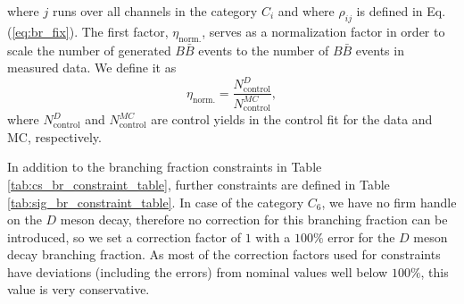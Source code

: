 where $j$ runs over all channels in the category $C_i$ and where $\rho_{ij}$ is defined in Eq. (\ref{eq:br_fix}). The first factor, $\eta_{\mathrm{norm.}}$, serves as a normalization factor in order to scale the number of generated $B \bar B$ events to the number of $B \bar B$ events in measured data. We define it as
\begin{equation}
\eta_{\mathrm{norm.}} = \frac{N_{\mathrm{control}}^D}{N_{\mathrm{control}}^{MC}},
\end{equation}
where $N_{\mathrm{control}}^D$ and $N_{\mathrm{control}}^{MC}$ are control yields in the control fit for the data and MC, respectively.

In addition to the branching fraction constraints in Table \ref{tab:cs_br_constraint_table}, further constraints are defined in Table \ref{tab:sig_br_constraint_table}. In case of the category $C_6$, we have no firm handle on the $D$ meson decay, therefore no correction for this branching fraction can be introduced, so we set a correction factor of $1$ with a $100\%$ error for the $D$ meson decay branching fraction. As most of the correction factors used for constraints have deviations (including the errors) from nominal values well below $100\%$, this value is very conservative.


